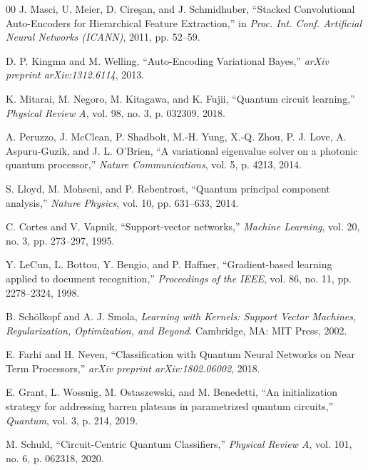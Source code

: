 \documentclass[conference]{IEEEtran}
\begin{document}
\begin{thebibliography}{00}
J. Masci, U. Meier, D. Cireşan, and J. Schmidhuber, ``Stacked 
Convolutional Auto-Encoders for Hierarchical Feature Extraction,'' in 
\textit{Proc. Int. Conf. Artificial Neural Networks (ICANN)}, 2011, 
pp. 52--59.

D. P. Kingma and M. Welling, ``Auto-Encoding Variational Bayes,'' 
\textit{arXiv preprint arXiv:1312.6114}, 2013.

K. Mitarai, M. Negoro, M. Kitagawa, and K. Fujii, ``Quantum circuit 
learning,'' \textit{Physical Review A}, vol. 98, no. 3, p. 032309, 2018.

A. Peruzzo, J. McClean, P. Shadbolt, M.-H. Yung, X.-Q. Zhou, P. J. Love, 
A. Aspuru-Guzik, and J. L. O'Brien, ``A variational eigenvalue solver on 
a photonic quantum processor,'' \textit{Nature Communications}, vol. 5, 
p. 4213, 2014.

S. Lloyd, M. Mohseni, and P. Rebentrost, ``Quantum principal component 
analysis,'' \textit{Nature Physics}, vol. 10, pp. 631--633, 2014.

C. Cortes and V. Vapnik, ``Support-vector networks,'' \textit{Machine 
Learning}, vol. 20, no. 3, pp. 273--297, 1995.

Y. LeCun, L. Bottou, Y. Bengio, and P. Haffner, ``Gradient-based learning 
applied to document recognition,'' \textit{Proceedings of the IEEE}, 
vol. 86, no. 11, pp. 2278--2324, 1998.

B. Schölkopf and A. J. Smola, \textit{Learning with Kernels: Support Vector 
Machines, Regularization, Optimization, and Beyond}. Cambridge, MA: MIT 
Press, 2002.

E. Farhi and H. Neven, ``Classification with Quantum Neural Networks on 
Near Term Processors,'' \textit{arXiv preprint arXiv:1802.06002}, 2018.

E. Grant, L. Wossnig, M. Ostaszewski, and M. Benedetti, ``An initialization 
strategy for addressing barren plateaus in parametrized quantum circuits,'' 
\textit{Quantum}, vol. 3, p. 214, 2019.

M. Schuld, ``Circuit-Centric Quantum Classifiers,'' \textit{Physical Review 
A}, vol. 101, no. 6, p. 062318, 2020.

\end{thebibliography}
\end{document}
